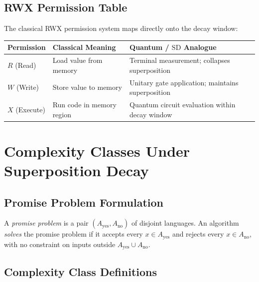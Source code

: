 \documentclass[12pt, a4paper]{article}
\theoremstyle{plain}
\theoremstyle{definition}
\theoremstyle{remark}
\newcommand{\SD}{\ensuremath{\mathrm{SD}}}   %
\begin{document}
\subsection{RWX Permission Table}

The classical RWX permission system maps directly onto the decay window:

\begin{center}
\begin{tabular}{@{}lll@{}}
  \toprule
  \textbf{Permission} & \textbf{Classical Meaning} & \textbf{Quantum / \SD{} Analogue} \\
  \midrule
  $R$ (Read)    & Load value from memory         & Terminal measurement; collapses superposition \\
  $W$ (Write)   & Store value to memory          & Unitary gate application; maintains superposition \\
  $X$ (Execute) & Run code in memory region      & Quantum circuit evaluation within decay window \\
  \bottomrule
\end{tabular}
\end{center}

\section{Complexity Classes Under Superposition Decay}
\label{sec:complexity}

\subsection{Promise Problem Formulation}

A \emph{promise problem} is a pair $(A_{\text{yes}}, A_{\text{no}})$ of
disjoint languages.  An algorithm \emph{solves} the promise problem if it
accepts every $x \in A_{\text{yes}}$ and rejects every $x \in A_{\text{no}}$,
with no constraint on inputs outside $A_{\text{yes}} \cup A_{\text{no}}$.

\subsection{Complexity Class Definitions}
\end{document}
